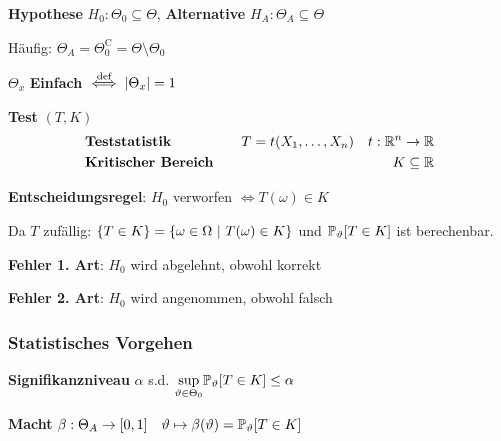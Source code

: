  \textbf{Hypothese} $H_0: \Theta_0 \subseteq \Theta$, \textbf{Alternative} $H_A: \Theta_A \subseteq \Theta$

\remark Häufig: $\Theta_A = \Theta_0^\text{C} = \Theta \setminus \Theta_0$

 $\Theta_x$ \textbf{Einfach} $\iffdef |\Theta_x| = 1$\\

 \textbf{Test} $(T,K)$\\
\begin{align*}
    &   \textbf{Teststatistik}\quad          & T = t(X_1,\ldots,X_n) \quad t: \R^n\to\R \\
    &   \textbf{Kritischer Bereich}\quad     & K \subseteq \R
\end{align*}

\textbf{Entscheidungsregel}: $H_0$ verworfen $\iff T(\omega) \in K$

{\footnotesize
    \remark Da $T$ zufällig: $\{T\in K\} = \{\omega\in\Omega\sep T(\omega)\in K\}$ und $\P_\vartheta[T\in K]$ ist berechenbar.
}

 \textbf{Fehler 1. Art}: $H_0$ wird abgelehnt, obwohl korrekt\\

 \textbf{Fehler 2. Art}: $H_0$ wird angenommen, obwohl falsch\\

\subsubsection{Statistisches Vorgehen}

 \textbf{Signifikanzniveau} $\alpha$ s.d. $\underset{\vartheta\in\Theta_0}{\sup}\P_\vartheta[T\in K] \leq \alpha$\\


 \textbf{Macht} $\beta: \Theta_A \to [0,1] \quad \vartheta \mapsto \beta(\vartheta) = \P_\vartheta[T \in K]$\\

